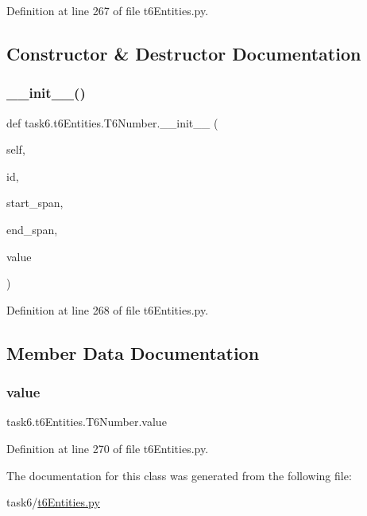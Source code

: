 Definition at line 267 of file t6\+Entities.\+py.



\subsection{Constructor \& Destructor Documentation}
\mbox{\label{classtask6_1_1t6Entities_1_1T6Number_a1b851deb36620e06ae15585568f49cc3}} 
\subsubsection{\texorpdfstring{\+\_\+\+\_\+init\+\_\+\+\_\+()}{\_\_init\_\_()}}
{\footnotesize\ttfamily def task6.\+t6\+Entities.\+T6\+Number.\+\_\+\+\_\+init\+\_\+\+\_\+ (\begin{DoxyParamCaption}\item[{}]{self,  }\item[{}]{id,  }\item[{}]{start\+\_\+span,  }\item[{}]{end\+\_\+span,  }\item[{}]{value }\end{DoxyParamCaption})}



Definition at line 268 of file t6\+Entities.\+py.



\subsection{Member Data Documentation}
\mbox{\label{classtask6_1_1t6Entities_1_1T6Number_a0a09fb41791cdfb13680185e7d996d8c}} 
\subsubsection{\texorpdfstring{value}{value}}
{\footnotesize\ttfamily task6.\+t6\+Entities.\+T6\+Number.\+value}



Definition at line 270 of file t6\+Entities.\+py.



The documentation for this class was generated from the following file\+:\begin{DoxyCompactItemize}
\item 
task6/\hyperlink{t6Entities_8py}{t6\+Entities.\+py}\end{DoxyCompactItemize}
